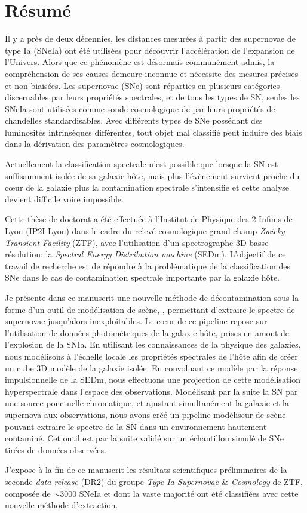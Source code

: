 \documentclass[../main/main.tex]{subfiles}
\begin{document}
\chapter*{Résumé}
\label{chap:resume}
\vspace{2cm}
Il y a près de deux décennies, les distances mesurées à partir des
supernovae de type Ia (SNeIa) ont été utilisées pour découvrir
l’accélération de l’expansion de l’Univers. Alors que ce phénomène est
désormais communément admis, la compréhension de ses causes demeure
inconnue et nécessite des mesures précises et non biaisées.
Les supernovae (SNe) sont réparties en plusieurs catégories discernables
par leurs propriétés spectrales, et de tous les types de SN, seules les
SNeIa sont utilisées comme sonde cosmologique de par leurs propriétés de
chandelles standardisables.
Avec différents types de SNe possédant des luminosités intrinsèques
différentes, tout objet mal classifié peut induire des biais dans la
dérivation des paramètres cosmologiques.

Actuellement la classification spectrale n'est possible que lorsque la SN est suffisamment
isolée de sa galaxie hôte, mais plus l'évènement survient proche du cœur
de la galaxie plus la contamination spectrale s'intensifie et cette analyse
devient difficile voire impossible.

Cette thèse de doctorat a été effectuée à l’Institut de Physique des 2
Infinis de Lyon (IP2I Lyon) dans le cadre du relevé cosmologique grand champ \textit{Zwicky
Transient Facility} (ZTF), avec l'utilisation d’un spectrographe 3D
basse résolution: la \textit{Spectral Energy Distribution machine}
(SEDm). L’objectif de ce travail de recherche est de répondre à la
problématique de la classification des SNe dans le cas de
contamination spectrale importante par la galaxie hôte. 

Je présente dans ce manuscrit une nouvelle
méthode de décontamination sous la forme d'un outil de modélisation de
scène, \hypergal, permettant d'extraire le spectre de supernovae jusqu'alors
inexploitables. Le cœur de ce pipeline repose sur l’utilisation de
données photométriques de la galaxie hôte, prises en amont de
l’explosion de la SNIa. En utilisant les connaissances de la physique
des galaxies, nous modélisons à l’échelle locale les propriétés
spectrales de l'hôte afin de créer un cube 3D modèle de la galaxie
isolée. En convoluant ce modèle par la réponse impulsionnelle de la
SEDm, nous effectuons une projection de cette modélisation
hyperspectrale dans l'espace des observations. Modélisant par la suite
la SN par une source ponctuelle chromatique, et ajustant simultanément la
galaxie et la supernova aux observations, nous avons créé un pipeline
modéliseur de scène pouvant extraire le spectre de la SN dans un
environnement hautement contaminé. Cet outil est par la suite validé sur un
échantillon simulé de SNe tirées de données observées.

J’expose à la fin de ce manuscrit les résultats scientifiques
préliminaires de la seconde \textit{data release} (DR2) du groupe \textit{Type Ia
Supernovae $\&$ Cosmology} de ZTF, composée de $\sim3000$ SNeIa et dont la vaste majorité ont
été classifiées avec cette nouvelle méthode d’extraction.
\end{document}
